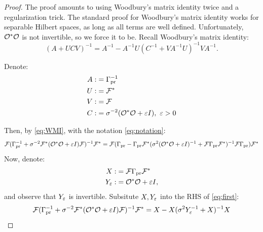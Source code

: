 \begin{proof}
  The proof amounts to using Woodbury's matrix identity twice and a
  regularization trick. The standard proof for Woodbury's matrix
  identity works for separable Hilbert spaces, as long as all terms
  are well defined. Unfortunately, $\mathcal{O}^*\mathcal{O}$ is not invertible, so
  we force it to be. Recall Woodbury's matrix identity:
  \begin{equation}\label{eq:WMI}
    (A + UCV)^{-1} = A^{-1} - A^{-1}U(C^{-1} + VA^{-1}U)^{-1}VA^{-1}. 
  \end{equation}

  Denote:
  \begin{align}\label{eq:notation}
    \begin{split}
      A :&= \prcov^{-1} \\
      U :&= \fwd^* \\
      V :&= \fwd \\
      C :&= \sigma^{-2} (\obs^*\obs+\eps I),\ \eps > 0
    \end{split}
  \end{align}

  Then, by \eqref{eq:WMI}, with the notation \eqref{eq:notation}:
  \begin{equation}\label{eq:first}
  \fwd( \prcov^{-1} + \sigma^{-2}  \fwd^* (\obs^* \obs +\eps I) \fwd )^{-1}\fwd^* = \fwd ( \prcov - \prcov \fwd^* ( \sigma^2(\obs^*\obs + \eps I)^{-1} + \fwd \prcov \fwd^* )^{-1} \fwd \prcov ) \fwd^* \\
  \end{equation}
  Now, denote:
  \begin{align*}
    X :&= \fwd\prcov \fwd^* \\
    Y_{\eps} :&= \obs^*\obs + \eps I,
  \end{align*}
  and observe that $Y_{\varepsilon}$ is invertible. Subsitute $X, Y_{\varepsilon}$
  into the RHS of \eqref{eq:first}:
   \begin{equation}\label{eq:second}
     \fwd( \prcov^{-1} + \sigma^{-2}  \fwd^* (\obs^* \obs +\eps I) \fwd )^{-1}\fwd^* = X - X(\sigma^2Y_{\eps}^{-1} + X)^{-1}X
   \end{equation}


\end{proof}
